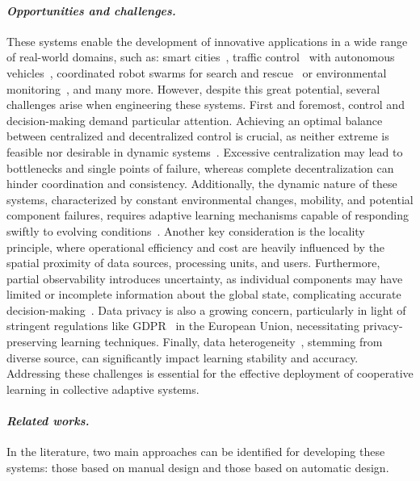 \documentclass[12pt]{article}
\begin{document}
\paragraph{\emph{Opportunities and challenges.}}
These systems enable the development of innovative applications in a wide range of real-world domains, such as: 
 smart cities~\cite{DBLP:conf/icse/IftikharRBW017}, 
 traffic control~\cite{DBLP:journals/tits/ChuWCL20,DBLP:books/sp/Muller2011/ProthmannTBHMS11} 
 with autonomous vehicles~\cite{DBLP:journals/corr/BojarskiTDFFGJM16}, 
 coordinated robot swarms for search and rescue~\cite{DBLP:journals/ijon/ZhouLLXS21} 
 or environmental monitoring~\cite{DBLP:conf/acsos/AguzziVE23}, and many more.
%
However, despite this great potential, several challenges arise when engineering these systems.
%
First and foremost, control and decision-making demand particular attention.
%
Achieving an optimal balance between centralized and decentralized control is crucial, 
 as neither extreme is feasible nor desirable in dynamic systems~\cite{DBLP:conf/coordination/CasadeiPVN19}. 
% 
Excessive centralization may lead to bottlenecks and single points of failure, 
 whereas complete decentralization can hinder coordination and consistency.
%
Additionally, the dynamic nature of these systems, characterized by constant 
 environmental changes, mobility, and potential component failures, requires adaptive 
 learning mechanisms capable of responding swiftly 
 to evolving conditions~\cite{DBLP:journals/swarm/PrasetyoMF19}.
%
Another key consideration is the locality principle, where operational efficiency and cost 
 are heavily influenced by the spatial proximity of data sources, processing units, and users.
%
Furthermore, partial observability introduces uncertainty, as individual components may have 
 limited or incomplete information about the global state, complicating accurate 
 decision-making~\cite{DBLP:conf/uai/HeDB22}.
%
Data privacy is also a growing concern, particularly in light of stringent regulations like GDPR~\cite{GDPR}
 in the European Union, necessitating privacy-preserving learning techniques.
%
Finally, data heterogeneity~\cite{DBLP:journals/fgcs/MaZLCQ22,DBLP:journals/ijon/ZhuXLJ21},
 stemming from diverse source, can significantly impact learning stability and accuracy.
%
Addressing these challenges is essential for the effective deployment of cooperative learning 
 in collective adaptive systems.

\paragraph{\emph{Related works.}}
In the literature, two main approaches can be identified for developing these systems: 
 those based on manual design and those based on automatic design.
\end{document}

